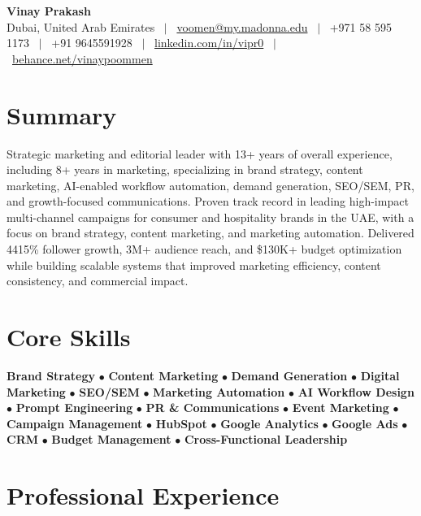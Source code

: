 \documentclass[10.5pt,a4paper]{article}
\begin{document}
\begin{center}
{\LARGE\bfseries Vinay Prakash}\\[0.3em]
\small Dubai, United Arab Emirates \ $|$ \ 
\href{mailto:voommen@my.madonna.edu}{voomen@my.madonna.edu} \ $|$ \ 
+971 58 595 1173 \ $|$ \ 
+91 9645591928 \ $|$ \ 
\href{https://linkedin.com/in/vipr0}{linkedin.com/in/vipr0} \ $|$ \ 
\href{https://behance.net/vinaypoommen}{behance.net/vinaypoommen}
\end{center}
\vspace{-6pt}

\section{Summary}
\small{Strategic marketing and editorial leader with 13+ years of overall experience, including 8+ years in marketing, specializing in brand strategy, content marketing, AI-enabled workflow automation, demand generation, SEO/SEM, PR, and growth-focused communications. Proven track record in leading high-impact multi-channel campaigns for consumer and hospitality brands in the UAE, with a focus on brand strategy, content marketing, and marketing automation. Delivered 4415\% follower growth, 3M+ audience reach, and \$130K+ budget optimization while building scalable systems that improved marketing efficiency, content consistency, and commercial impact.}

\section{Core Skills}
\small{\textbf{Brand Strategy} $\bullet$ \textbf{Content Marketing} $\bullet$ \textbf{Demand Generation} $\bullet$ \textbf{Digital Marketing} $\bullet$ \textbf{SEO/SEM} $\bullet$ \textbf{Marketing Automation} $\bullet$ \textbf{AI Workflow Design} $\bullet$ \textbf{Prompt Engineering} $\bullet$ \textbf{PR \& Communications} $\bullet$ \textbf{Event Marketing} $\bullet$ \textbf{Campaign Management} $\bullet$ \textbf{HubSpot} $\bullet$ \textbf{Google Analytics} $\bullet$ \textbf{Google Ads} $\bullet$ \textbf{CRM} $\bullet$ \textbf{Budget Management} $\bullet$ \textbf{Cross-Functional Leadership}}

\section{Professional Experience}
\end{document}
